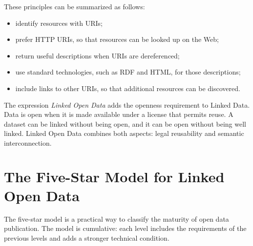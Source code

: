 \documentclass{scrbook}
\begin{document}
	These principles can be summarized as follows:
	
	\begin{itemize}
	    \item identify resources with URIs;
	    \item prefer HTTP URIs, so that resources can be looked up on the Web;
	    \item return useful descriptions when URIs are dereferenced;
	    \item use standard technologies, such as RDF and HTML, for those descriptions;
	    \item include links to other URIs, so that additional resources can be discovered.
	\end{itemize}
	
	The expression \emph{Linked Open Data} adds the openness requirement to Linked Data. Data is open when it is made available under a license that permits reuse. A dataset can be linked without being open, and it can be open without being well linked. Linked Open Data combines both aspects: legal reusability and semantic interconnection.
	
	\section{The Five-Star Model for Linked Open Data}
	
	The five-star model is a practical way to classify the maturity of open data publication. The model is cumulative: each level includes the requirements of the previous levels and adds a stronger technical condition.\\
	
\end{document}

